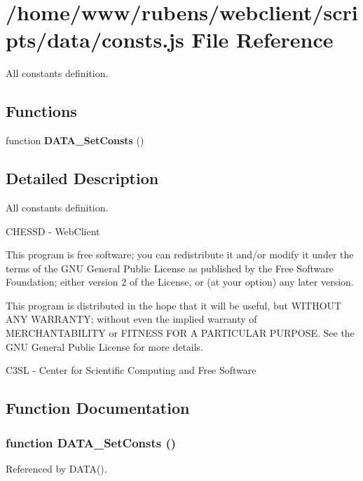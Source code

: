 \section{/home/www/rubens/webclient/scripts/data/consts.js File Reference}
\label{consts_8js}
All constants definition. 

\subsection*{Functions}
\begin{CompactItemize}
\item 
function {\bf DATA\_\-SetConsts} ()
\end{CompactItemize}


\subsection{Detailed Description}
All constants definition. 

CHESSD - WebClient

This program is free software; you can redistribute it and/or modify it under the terms of the GNU General Public License as published by the Free Software Foundation; either version 2 of the License, or (at your option) any later version.

This program is distributed in the hope that it will be useful, but WITHOUT ANY WARRANTY; without even the implied warranty of MERCHANTABILITY or FITNESS FOR A PARTICULAR PURPOSE. See the GNU General Public License for more details.

C3SL - Center for Scientific Computing and Free Software 

\subsection{Function Documentation}
\subsubsection[DATA\_\-SetConsts]{\setlength{\rightskip}{0pt plus 5cm}function DATA\_\-SetConsts ()}\label{consts_8js_a673616af9924b68649f78b3e552485e}




Referenced by DATA().